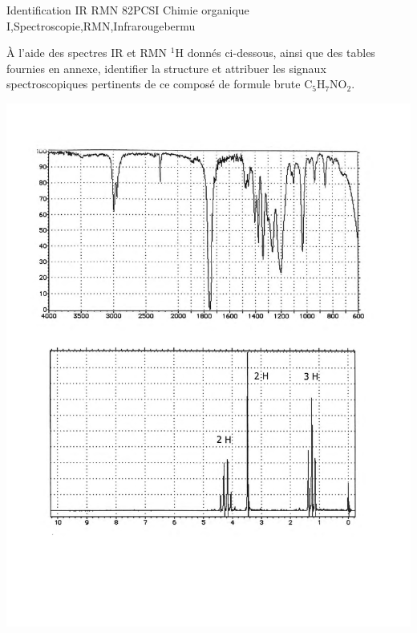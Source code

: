 \begin{exercise}{Identification IR RMN 8}{2}{PCSI}
{Chimie organique I,Spectroscopie,RMN,Infrarouge}{bermu}

À l'aide des spectres IR et RMN $^{1}$H donnés ci-dessous, ainsi que des tables fournies en annexe, identifier la structure et attribuer les signaux spectroscopiques pertinents de ce composé de formule brute $\mathrm{C_5H_7NO_2}$.
 
\vspace{2em}
 
\includegraphics[width=\linewidth]{chimiePC/orga/IR_RMN_8.pdf}

\end{exercise}

\begin{solution}
\begin{center}
\end{center}
\end{solution}